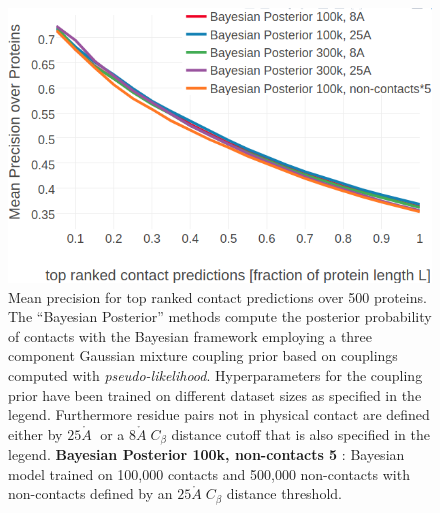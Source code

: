\documentclass[11pt,a4paper,twoside]{book}
\newcommand{\Cb}{C_\beta}
\newcommand{\angstrom}{\mathring{A} \;}
\theoremstyle{definition}
\theoremstyle{definition}
\theoremstyle{remark}
\begin{document}
\begin{figure}

{\centering \includegraphics[width=0.9\linewidth]{img/bayesian_model/benchmark/precision_vs_rank_pll_3comp_ncthr} 

}

\caption{Mean precision
for top ranked contact predictions over 500 proteins. The ``Bayesian
Posterior'' methods compute the posterior probability of contacts with
the Bayesian framework employing a three component Gaussian mixture
coupling prior based on couplings computed with
\emph{pseudo-likelihood}. Hyperparameters for the coupling prior have
been trained on different dataset sizes as specified in the legend.
Furthermore residue pairs not in physical contact are defined either by
\(25 \angstrom\) or a \(8 \angstrom \Cb\) distance cutoff that is also
specified in the legend. \textbf{Bayesian Posterior 100k, non-contacts 5
}: Bayesian model trained on 100,000 contacts and 500,000 non-contacts
with non-contacts defined by an \(25 \angstrom \Cb\) distance threshold.}\label{fig:precision-bayesian-model-pll-3comp-ncthr}
\end{figure}
\end{document}
